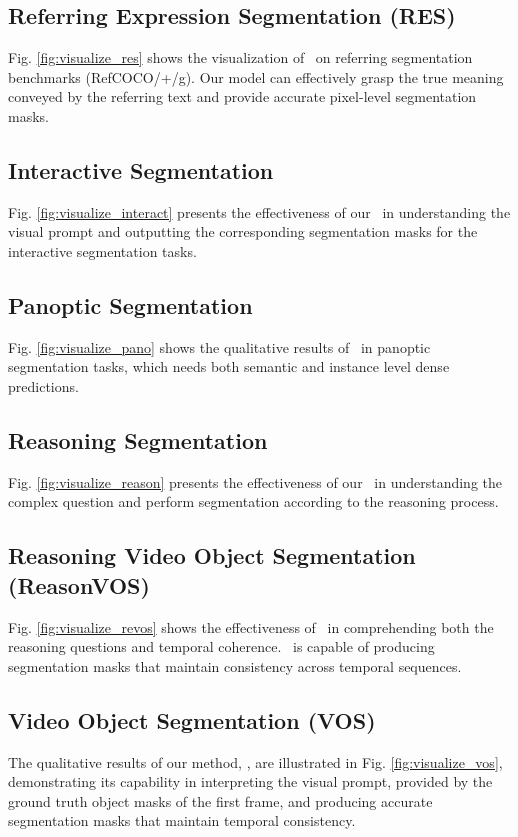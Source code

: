 \subsection{Referring Expression Segmentation (RES)}
Fig. \ref{fig:visualize_res} shows the visualization of \name~on referring segmentation benchmarks (RefCOCO/+/g).
Our model can effectively grasp the true meaning conveyed by the referring text and provide accurate pixel-level segmentation masks.

\subsection{Interactive Segmentation}
Fig. \ref{fig:visualize_interact} presents the effectiveness of our \name~in understanding the visual prompt and outputting the corresponding segmentation masks for the interactive segmentation tasks. 

\subsection{Panoptic Segmentation}
Fig. \ref{fig:visualize_pano} shows the qualitative results of \name~in panoptic segmentation tasks, which needs
both semantic and instance level dense predictions.

\subsection{Reasoning Segmentation}
Fig. \ref{fig:visualize_reason} presents the effectiveness of our \name~in understanding the complex question and perform segmentation according to the reasoning process. 

\subsection{Reasoning Video Object Segmentation (ReasonVOS)}
Fig. \ref{fig:visualize_revos} shows the effectiveness of \name~in comprehending both the reasoning questions and temporal coherence. \name~is capable of producing segmentation masks that maintain consistency across temporal sequences.

\subsection{Video Object Segmentation (VOS)}
The qualitative results of our method, \name, are illustrated in Fig. \ref{fig:visualize_vos}, demonstrating its capability in interpreting the visual prompt, provided by the ground truth object masks of the first frame, and producing accurate segmentation masks that maintain temporal consistency.

